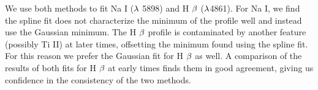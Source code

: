\documentclass[a4paper,fleqn,usenatbib]{mnras}
\begin{document}
We use both methods to fit Na I ($\rm{\lambda}$ 5898) and H $\rm{\beta}$ ($\rm{\lambda}$4861). 
For Na I, we find the spline fit does not characterize the minimum of the profile well and instead use the Gaussian minimum. 
The H $\rm{\beta}$ profile is contaminated by another feature (possibly Ti II) at later times, offsetting the minimum found using the spline fit. 
For this reason we prefer the Gaussian fit for H $\rm{\beta}$ as well. 
A comparison of the results of both fits for H $\rm{\beta}$ at early times finds them in good agreement, giving us confidence in the consistency of the two methods.

\bsp	%
\label{lastpage}
\end{document}
